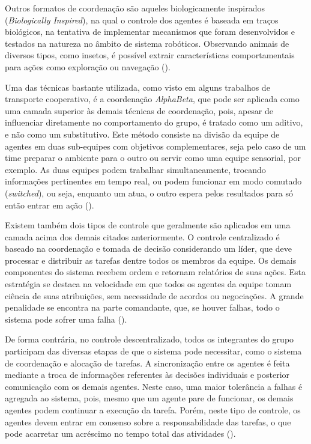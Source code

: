 Outros formatos de coordenação são aqueles biologicamente inspirados (\emph{Biologically Inspired}), na qual o controle dos agentes é baseada em traços biológicos, na tentativa de implementar mecanismos que foram desenvolvidos e testados na natureza no âmbito de sistema robóticos. Observando animais de diversos tipos, como insetos, é possível extrair características comportamentais para ações como exploração ou navegação (\cite{Kube2000}).

Uma das técnicas bastante utilizada, como visto em alguns trabalhos de transporte cooperativo, é a coordenação \emph{AlphaBeta}, que pode ser aplicada como uma camada superior às demais técnicas de coordenação, pois, apesar de influenciar diretamente no comportamento do grupo, é tratado como um aditivo, e não como um substitutivo. Este método consiste na divisão da equipe de agentes em duas sub-equipes com objetivos complementares, seja pelo caso de um time preparar o ambiente para o outro ou servir como uma equipe sensorial, por exemplo.
As duas equipes podem trabalhar simultaneamente, trocando informações pertinentes em tempo real, ou podem funcionar em modo comutado (\emph{switched}), ou seja, enquanto um atua, o outro espera pelos resultados para só então entrar em ação (\cite{Goldsmith1998}).

Existem também dois tipos de controle que geralmente são aplicados em uma camada acima dos demais citados anteriormente.
O controle centralizado é baseado na coordenação e tomada de decisão considerando um líder, que deve processar e distribuir as tarefas dentre todos os membros da equipe. Os demais componentes do sistema recebem ordem e retornam relatórios de suas ações.
Esta estratégia se destaca na velocidade em que todos os agentes da equipe tomam ciência de suas atribuições, sem necessidade de acordos ou negociações. A grande penalidade se encontra na parte comandante, que, se houver falhas, todo o sistema pode sofrer uma falha (\cite{Farinelli2004, Miyata2002}).

De forma contrária, no controle descentralizado, todos os integrantes do grupo participam das diversas etapas de que o sistema pode necessitar, como o sistema de coordenação e alocação de tarefas. A sincronização entre os agentes é feita mediante a troca de informações referentes às decisões individuais e posterior comunicação com os demais agentes.
Neste caso, uma maior tolerância a falhas é agregada ao sistema, pois, mesmo que um agente pare de funcionar, os demais agentes podem continuar a execução da tarefa. Porém, neste tipo de controle, os agentes devem entrar em consenso sobre a responsabilidade das tarefas, o que pode acarretar um acréscimo no tempo total das atividades (\cite{Farinelli2004}).

